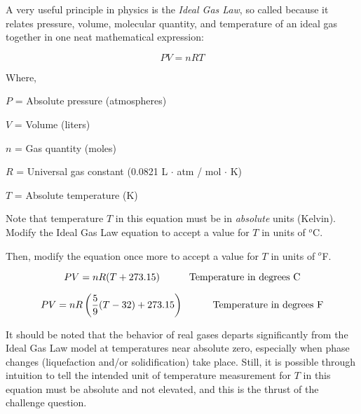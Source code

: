 

A very useful principle in physics is the {\it Ideal Gas Law}, so called because it relates pressure, volume, molecular quantity, and temperature of an ideal gas together in one neat mathematical expression:

$$PV = nRT$$

\noindent
Where,

$P$ = Absolute pressure (atmospheres)

$V$ = Volume (liters)

$n$ = Gas quantity (moles)

$R$ = Universal gas constant (0.0821 L $\cdot$ atm / mol $\cdot$ K)

$T$ = Absolute temperature (K)

\vskip 10pt

Note that temperature $T$ in this equation must be in {\it absolute} units (Kelvin).  Modify the Ideal Gas Law equation to accept a value for $T$ in units of $^{o}$C.

Then, modify the equation once more to accept a value for $T$ in units of $^{o}$F.







$$PV = nR(T + 273.15) \hbox{\hskip 30pt Temperature in degrees C}$$

$$PV = nR\left({5 \over 9}(T - 32) + 273.15\right) \hbox{\hskip 30pt Temperature in degrees F}$$

It should be noted that the behavior of real gases departs significantly from the Ideal Gas Law model at temperatures near absolute zero, especially when phase changes (liquefaction and/or solidification) take place.  Still, it is possible through intuition to tell the intended unit of temperature measurement for $T$ in this equation must be absolute and not elevated, and this is the thrust of the challenge question.











